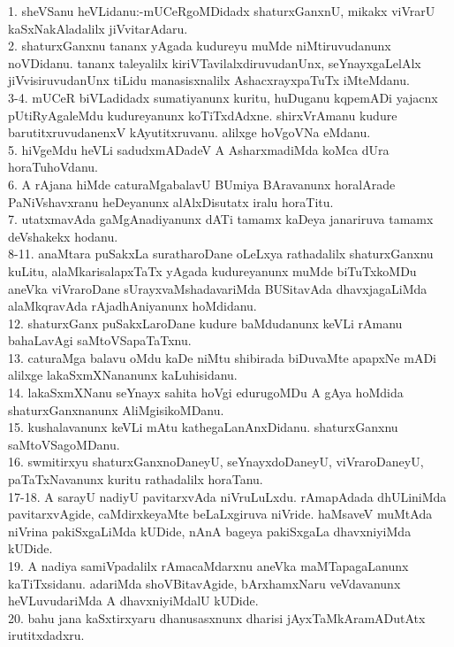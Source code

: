 \documentclass{article}
\begin{document}
1. sheVSanu heVLidanu:-mUCeRgoMDidadx shaturxGanxnU, mikakx viVrarU kaSxNakAladalilx jiVvitarAdaru.\\
2. shaturxGanxnu tananx yAgada kudureyu muMde niMtiruvudanunx noVDidanu. tananx taleyalilx kiriVTavilalxdiruvudanUnx, seYnayxgaLelAlx jiVvisiruvudanUnx tiLidu manasisxnalilx AshacxrayxpaTuTx iMteMdanu.\\
3-4. mUCeR biVLadidadx sumatiyanunx kuritu, huDuganu kqpemADi yajacnx pUtiRyAgaleMdu kudureyanunx koTiTxdAdxne. shirxVrAmanu kudure barutitxruvudanenxV kAyutitxruvanu. alilxge hoVgoVNa eMdanu.\\
5. hiVgeMdu heVLi sadudxmADadeV A AsharxmadiMda koMca dUra horaTuhoVdanu.\\
6. A rAjana hiMde caturaMgabalavU BUmiya BAravanunx horalArade PaNiVshavxranu heDeyanunx alAlxDisutatx iralu horaTitu.\\
7. utatxmavAda gaMgAnadiyanunx dATi tamamx kaDeya janariruva tamamx deVshakekx hodanu.\\
8-11. anaMtara puSakxLa suratharoDane oLeLxya rathadalilx shaturxGanxnu kuLitu, alaMkarisalapxTaTx yAgada kudureyanunx muMde biTuTxkoMDu aneVka viVraroDane sUrayxvaMshadavariMda BUSitavAda dhavxjagaLiMda alaMkqravAda rAjadhAniyanunx hoMdidanu.\\
12. shaturxGanx puSakxLaroDane kudure baMdudanunx keVLi rAmanu bahaLavAgi saMtoVSapaTaTxnu.\\
13. caturaMga balavu oMdu kaDe niMtu shibirada biDuvaMte apapxNe mADi alilxge lakaSxmXNananunx kaLuhisidanu.\\
14. lakaSxmXNanu seYnayx sahita hoVgi edurugoMDu A gAya hoMdida shaturxGanxnanunx AliMgisikoMDanu.\\
15. kushalavanunx keVLi mAtu kathegaLanAnxDidanu. shaturxGanxnu saMtoVSagoMDanu.\\
16. swmitirxyu shaturxGanxnoDaneyU, seYnayxdoDaneyU, viVraroDaneyU, paTaTxNavanunx kuritu rathadalilx horaTanu.\\
17-18. A sarayU nadiyU pavitarxvAda niVruLuLxdu. rAmapAdada dhULiniMda pavitarxvAgide, caMdirxkeyaMte beLaLxgiruva niVride. haMsaveV muMtAda niVrina pakiSxgaLiMda kUDide, nAnA bageya pakiSxgaLa dhavxniyiMda kUDide.\\
19. A nadiya samiVpadalilx rAmacaMdarxnu aneVka maMTapagaLanunx kaTiTxsidanu. adariMda shoVBitavAgide, bArxhamxNaru veVdavanunx heVLuvudariMda A dhavxniyiMdalU kUDide.\\
20. bahu jana kaSxtirxyaru dhanusasxnunx dharisi jAyxTaMkAramADutAtx irutitxdadxru.\\
\end{document}
